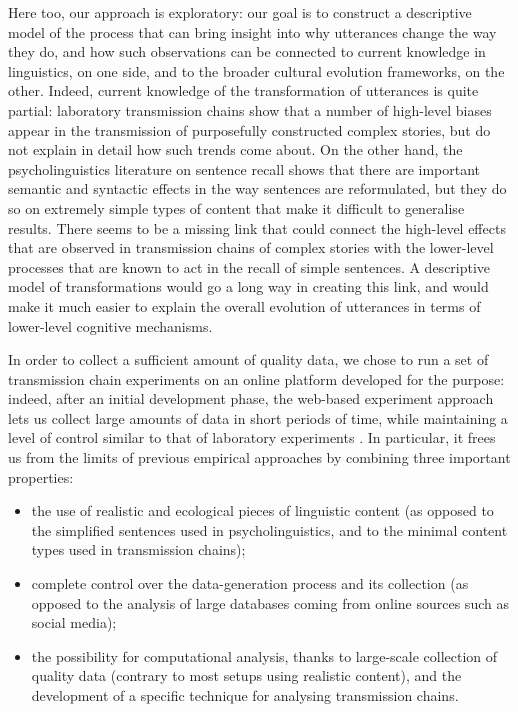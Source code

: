 \documentclass[english,]{article}
\begin{document}
Here too, our approach is exploratory:
our goal is to construct a descriptive model of the process that can bring insight into why utterances change the way they do, and how such observations can be connected to current knowledge in linguistics, on one side, and to the broader cultural evolution frameworks, on the other.
Indeed, current knowledge of the transformation of utterances is quite partial:
laboratory transmission chains show that a number of high-level biases appear in the transmission of purposefully constructed complex stories, but do not explain in detail how such trends come about.
On the other hand, the psycholinguistics literature on sentence recall shows that there are important semantic and syntactic effects in the way sentences are reformulated, but they do so on extremely simple types of content that make it difficult to generalise results.
There seems to be a missing link that could connect the high-level effects that are observed in transmission chains of complex stories with the lower-level processes that are known to act in the recall of simple sentences.
A descriptive model of transformations would go a long way in creating this link, and would make it much easier to explain the overall evolution of utterances in terms of lower-level cognitive mechanisms.

In order to collect a sufficient amount of quality data, we chose to run a set of transmission chain experiments on an online platform developed for the purpose:
indeed, after an initial development phase, the web-based experiment approach lets us collect large amounts of data in short periods of time, while maintaining a level of control similar to that of laboratory experiments \autocite{lerique_gistr_2016}. 
In particular, it frees us from the limits of previous empirical approaches by combining three important properties:
\begin{itemize}
  \item the use of realistic and ecological pieces of linguistic content (as opposed to the simplified sentences used in psycholinguistics, and to the minimal content types used in transmission chains);
  \item complete control over the data-generation process and its collection (as opposed to the analysis of large databases coming from online sources such as social media);
  \item the possibility for computational analysis, thanks to large-scale collection of quality data (contrary to most setups using realistic content), and the development of a specific technique for analysing transmission chains.
\end{itemize}
\end{document}
